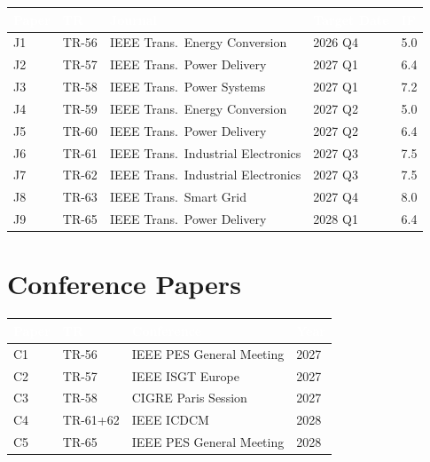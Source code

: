 \documentclass[12pt, a4paper]{report}
\begin{document}
\begin{center}
\renewcommand{\arraystretch}{1.35}
\begin{tabular}{C{0.5cm} C{0.8cm} L{4.5cm} L{3.0cm} C{1.8cm}}
\toprule
{}
\textcolor{white}{\textbf{Paper}} &
\textcolor{white}{\textbf{TR}} &
\textcolor{white}{\textbf{Journal}} &
\textcolor{white}{\textbf{Target Date}} &
\textcolor{white}{\textbf{IF}} \\
\midrule
J1 & TR-56 & IEEE Trans.\ Energy Conversion & 2026 Q4 & 5.0 \\
J2 & TR-57 & IEEE Trans.\ Power Delivery & 2027 Q1 & 6.4 \\
J3 & TR-58 & IEEE Trans.\ Power Systems & 2027 Q1 & 7.2 \\
J4 & TR-59 & IEEE Trans.\ Energy Conversion & 2027 Q2 & 5.0 \\
J5 & TR-60 & IEEE Trans.\ Power Delivery & 2027 Q2 & 6.4 \\
J6 & TR-61 & IEEE Trans.\ Industrial Electronics & 2027 Q3 & 7.5 \\
J7 & TR-62 & IEEE Trans.\ Industrial Electronics & 2027 Q3 & 7.5 \\
J8 & TR-63 & IEEE Trans.\ Smart Grid & 2027 Q4 & 8.0 \\
J9 & TR-65 & IEEE Trans.\ Power Delivery & 2028 Q1 & 6.4 \\
\bottomrule
\end{tabular}
\end{center}

\section{Conference Papers}

\begin{center}
\renewcommand{\arraystretch}{1.3}
\begin{tabular}{C{0.6cm} C{0.8cm} L{5.5cm} C{1.8cm}}
\toprule
{}
\textcolor{white}{\textbf{Paper}} & \textcolor{white}{\textbf{TR}} &
\textcolor{white}{\textbf{Conference}} & \textcolor{white}{\textbf{Year}} \\
\midrule
C1 & TR-56 & IEEE PES General Meeting & 2027 \\
C2 & TR-57 & IEEE ISGT Europe & 2027 \\
C3 & TR-58 & CIGRE Paris Session & 2027 \\
C4 & TR-61+62 & IEEE ICDCM & 2028 \\
C5 & TR-65 & IEEE PES General Meeting & 2028 \\
\bottomrule
\end{tabular}
\end{center}
\end{document}
